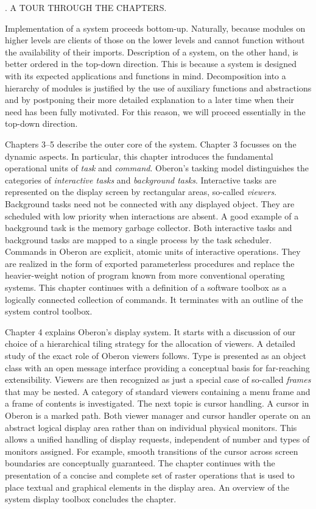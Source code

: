 . A TOUR THROUGH THE CHAPTERS.

Implementation of a system proceeds bottom-up. Naturally, because
modules on higher levels are clients of those on the lower levels and
cannot function without the availability of their imports. Description
of a system, on the other hand, is better ordered in the top-down
direction. This is because a system is designed with its expected
applications and functions in mind. Decomposition into a hierarchy of
modules is justified by the use of auxiliary functions and
abstractions and by postponing their more detailed explanation to a
later time when their need has been fully motivated. For this reason,
we will proceed essentially in the top-down direction.

Chapters 3--5 describe the outer core of the system. Chapter 3
focusses on the dynamic aspects. In particular, this chapter
introduces the fundamental operational units of \emph{task} and
\emph{command}. Oberon's tasking model distinguishes the categories of
\emph{interactive tasks} and \emph{background tasks}. Interactive tasks are
represented on the display screen by rectangular areas, so-called
\emph{viewers}. Background tasks need not be connected with any displayed
object. They are scheduled with low priority when interactions are
absent. A good example of a background task is the memory garbage
collector. Both interactive tasks and background tasks are mapped to a
single process by the task scheduler. Commands in Oberon are explicit,
atomic units of interactive operations. They are realized in the form
of exported parameterless procedures and replace the heavier-weight
notion of program known from more conventional operating systems. This
chapter continues with a definition of a software toolbox as a
logically connected collection of commands. It terminates with an
outline of the system control toolbox.


Chapter 4 explains Oberon's display system. It starts with a
discussion of our choice of a hierarchical tiling strategy for the
allocation of viewers. A detailed study of the exact role of Oberon
viewers follows. Type  is presented as an object class
with an open message interface providing a conceptual basis for far-reaching
extensibility. Viewers are then recognized as just a special case of
so-called \emph{frames} that may be nested. A category of standard viewers
containing a menu frame and a frame of contents is investigated. The
next topic is cursor handling. A cursor in Oberon is a marked
path. Both viewer manager and cursor handler operate on an abstract
logical display area rather than on individual physical monitors. This
allows a unified handling of display requests, independent of number
and types of monitors assigned. For example, smooth transitions of the
cursor across screen boundaries are conceptually guaranteed. The
chapter continues with the presentation of a concise and complete set
of raster operations that is used to place textual and graphical
elements in the display area. An overview of the system display
toolbox concludes the chapter.

